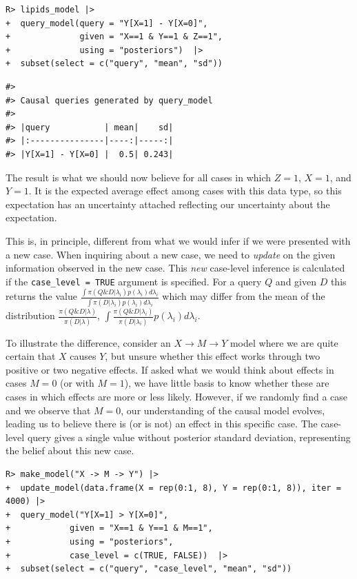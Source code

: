 \documentclass[
  11pt,
  article]{jss}
\begin{document}
\begin{verbatim}
R> lipids_model |>
+  query_model(query = "Y[X=1] - Y[X=0]",
+              given = "X==1 & Y==1 & Z==1",
+              using = "posteriors")  |> 
+  subset(select = c("query", "mean", "sd"))
\end{verbatim}

\begin{verbatim}
#> 
#> Causal queries generated by query_model
#> 
#> |query           | mean|    sd|
#> |:---------------|----:|-----:|
#> |Y[X=1] - Y[X=0] |  0.5| 0.243|
\end{verbatim}

The result is what we should now believe for all cases in which \(Z=1\),
\(X=1\), and \(Y=1\). It is the expected average effect among cases with
this data type, so this expectation has an uncertainty attached
reflecting our uncertainty about the expectation.

This is, in principle, different from what we would infer if we were
presented with a new case. When inquiring about a new case, we need to
\emph{update} on the given information observed in the new case. This
\emph{new} case-level inference is calculated if the
\texttt{case\_level\ =\ TRUE} argument is specified. For a query \(Q\)
and given \(D\) this returns the value
\(\frac{\int\pi(Q \& D | \lambda_i)p(\lambda_i)d\lambda_i}{\int\pi(D | \lambda_i)p(\lambda_i)d\lambda_i}\)
which may differ from the mean of the distribution
\(\frac{\pi(Q \& D | \lambda)}{\pi(D | \lambda)}\),
\(\int \frac{\pi(Q \& D | \lambda_i)}{\pi(D | \lambda_i)} p(\lambda_i)d\lambda_i\).

To illustrate the difference, consider an
\(X \rightarrow M \rightarrow Y\) model where we are quite certain that
\(X\) causes \(Y\), but unsure whether this effect works through two
positive or two negative effects. If asked what we would think about
effects in cases \(M=0\) (or with \(M=1\)), we have little basis to know
whether these are cases in which effects are more or less likely.
However, if we randomly find a case and we observe that \(M=0\), our
understanding of the causal model evolves, leading us to believe there
is (or is not) an effect in this specific case. The case-level query
gives a single value without posterior standard deviation, representing
the belief about this new case.

\begin{verbatim}
R> make_model("X -> M -> Y") |>
+  update_model(data.frame(X = rep(0:1, 8), Y = rep(0:1, 8)), iter = 4000) |>
+  query_model("Y[X=1] > Y[X=0]", 
+            given = "X==1 & Y==1 & M==1", 
+            using = "posteriors",
+            case_level = c(TRUE, FALSE))  |> 
+  subset(select = c("query", "case_level", "mean", "sd"))
\end{verbatim}
\end{document}
